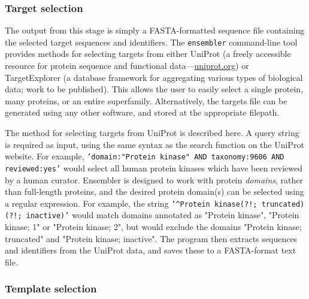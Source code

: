 \documentclass[aps,pre,twocolumn,nofootinbib,superscriptaddress,linenumbers]{revtex4-1}
\begin{document}
\subsubsection{Target selection}

The output from this stage is simply a FASTA-formatted sequence file containing
the selected target sequences and identifiers. The {\tt ensembler} command-line
tool provides methods for selecting targets from either UniProt (a freely
accessible resource for protein sequence and functional
data---\href{http://www.uniprot.org/}{uniprot.org}) or TargetExplorer (a
database framework for aggregating various types of biological data; work to be
published). This allows the user to easily select a single protein, many
proteins, or an entire superfamily. Alternatively, the targets file can be
generated using any other software, and stored at the appropriate filepath.

The method for selecting targets from UniProt is described here. A query string
is required as input, using the same syntax as the search function on the
UniProt website. For example, {\tt'domain:"Protein kinase" AND taxonomy:9606
AND reviewed:yes'} would select all human protein kinases which have been
reviewed by a human curator. Ensembler is designed to work with protein
\emph{domains}, rather than full-length proteins, and the desired protein
domain(s) can be selected using a regular expression. For example, the string
{\tt'\^{}Protein kinase(?!; truncated)(?!; inactive)'} would match domains
annotated as "Protein kinase", "Protein kinase; 1" or "Protein kinase; 2", but
would exclude the domains "Protein kinase; truncated" and "Protein kinase;
inactive". The program then extracts sequences and identifiers from the UniProt
data, and saves these to a FASTA-format text file.


\subsubsection{Template selection}
\end{document}
